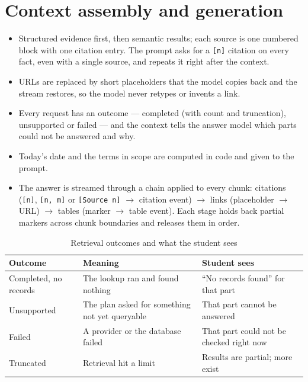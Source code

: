 \documentclass[11pt,letterpaper]{report}
\begin{document}
\section{Context assembly and generation}
\begin{itemize}
  \item Structured evidence first, then semantic results; each source is one numbered block with one
        citation entry. The prompt asks for a \texttt{[n]} citation on every fact, even with a single
        source, and repeats it right after the context.
  \item URLs are replaced by short placeholders that the model copies back and the stream restores, so
        the model never retypes or invents a link.
  \item Every request has an outcome --- completed (with count and truncation), unsupported or failed ---
        and the context tells the answer model which parts could not be answered and why.
  \item Today's date and the terms in scope are computed in code and given to the prompt.
  \item The answer is streamed through a chain applied to every chunk: citations
        (\texttt{[n]}, \texttt{[n, m]} or \texttt{[Source n]} $\rightarrow$ citation event) $\rightarrow$ links (placeholder $\rightarrow$ URL)
        $\rightarrow$ tables (marker $\rightarrow$ table event). Each stage holds back partial markers across
        chunk boundaries and releases them in order.
\end{itemize}

\begin{table}[H]
\centering
\caption{Retrieval outcomes and what the student sees}\label{tab:outcomes}
\begin{tabularx}{\textwidth}{@{}P{3.6cm}LL@{}}
\toprule
\textbf{Outcome} & \textbf{Meaning} & \textbf{Student sees} \\
\midrule
Completed, no records & The lookup ran and found nothing & ``No records found'' for that part \\
Unsupported & The plan asked for something not yet queryable & That part cannot be answered \\
Failed & A provider or the database failed & That part could not be checked right now \\
Truncated & Retrieval hit a limit & Results are partial; more exist \\
\bottomrule
\end{tabularx}
\end{table}
\end{document}

